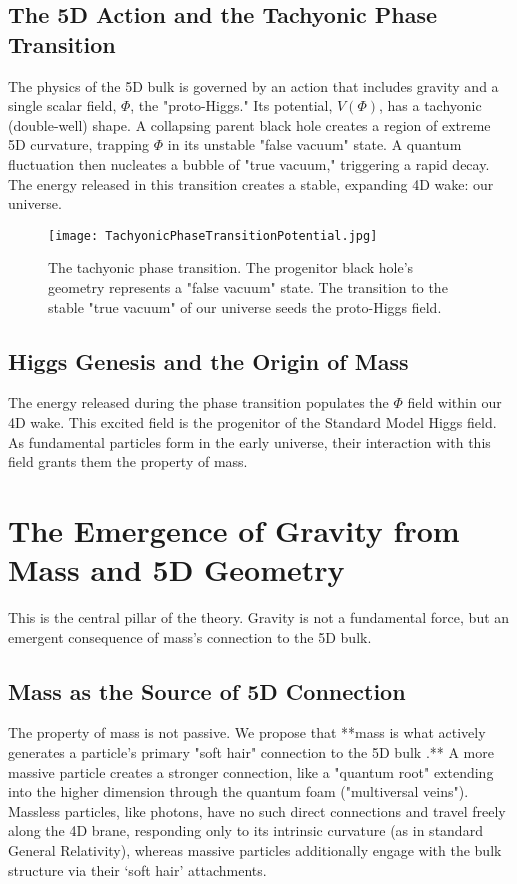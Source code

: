 \documentclass[aps,prd,onecolumn,10pt,superscriptaddress,nofootinbib,floatfix]{revtex4-2}
\begin{document}
\subsection{The 5D Action and the Tachyonic Phase Transition}
The physics of the 5D bulk is governed by an action that includes gravity and a single scalar field, $\Phi$, the "proto-Higgs." Its potential, $V(\Phi)$, has a tachyonic (double-well) shape. A collapsing parent black hole creates a region of extreme 5D curvature, trapping $\Phi$ in its unstable "false vacuum" state. A quantum fluctuation then nucleates a bubble of "true vacuum," triggering a rapid decay. The energy released in this transition creates a stable, expanding 4D wake: our universe.

\begin{figure}[H]
  \centering
  \texttt{[image: TachyonicPhaseTransitionPotential.jpg]}
  \caption{The tachyonic phase transition. The progenitor black hole's geometry represents a "false vacuum" state. The transition to the stable "true vacuum" of our universe seeds the proto-Higgs field.}
  \label{fig:tachyonic_potential}
\end{figure}

\subsection{Higgs Genesis and the Origin of Mass}
The energy released during the phase transition populates the $\Phi$ field within our 4D wake. This excited field is the progenitor of the Standard Model Higgs field. As fundamental particles form in the early universe, their interaction with this field grants them the property of mass.

\section{The Emergence of Gravity from Mass and 5D Geometry}
This is the central pillar of the theory. Gravity is not a fundamental force, but an emergent consequence of mass's connection to the 5D bulk.

\subsection{Mass as the Source of 5D Connection}
The property of mass is not passive. We propose that **mass is what actively generates a particle's primary "soft hair" connection to the 5D bulk \cite{Hawking2016}.** A more massive particle creates a stronger connection, like a "quantum root" extending into the higher dimension through the quantum foam ("multiversal veins"). Massless particles, like photons, have no such direct connections and travel freely along the 4D brane, responding only to its intrinsic curvature (as in standard General Relativity), whereas massive particles additionally engage with the bulk structure via their ‘soft hair’ attachments.
\end{document}
